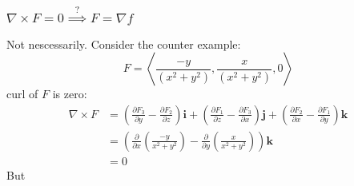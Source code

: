 \documentclass[a4paper]{article}
\begin{document}
\subsubsection{$\nabla \times F = 0 \stackrel{?}{\implies} F = \nabla f$}
Not nescessarily. Consider the counter example:
\[
    F = \left< \frac{-y}{(x^2+y^2)}, \frac{x}{(x^2+y^2)}, 0 \right>  
\]
curl of $F$ is zero:
\begin{align*}
    \nabla \times F &= \left( \frac{\partial F_3}{\partial y} - \frac{\partial F_2}{\partial z} \right) \mathbf{i} + \left( \frac{\partial F_1}{\partial z} - \frac{\partial F_3}{\partial x} \right) \mathbf{j} + \left( \frac{\partial F_2}{\partial x} - \frac{\partial F_1}{\partial y} \right) \mathbf{k} \\
    &=  \left( \frac{\partial}{\partial x} \left( \frac{-y}{x^2+y^2} \right)  -  \frac{\partial}{\partial y} \left( \frac{x}{x^2+y^2} \right) \right) \mathbf{k}\\
    &= 0
\end{align*}
But 
\end{document}
